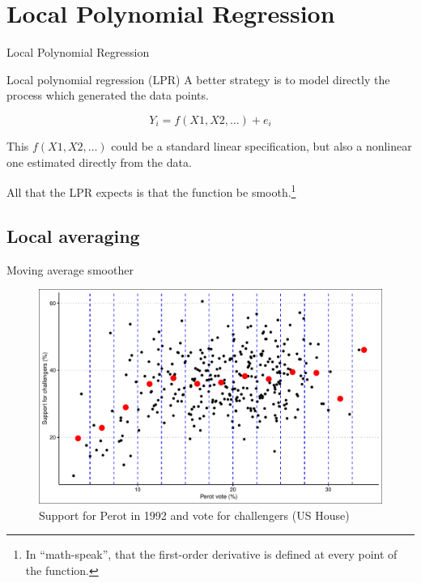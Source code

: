 \documentclass[12pt,english,pdf,xcolor=dvipsnames,aspectratio=169,handout]{beamer}\usepackage[]{graphicx}\usepackage[]{xcolor}
\begin{document}
\section{Local Polynomial Regression}

\begin{frame}
\begin{center}
    \Huge Local Polynomial Regression
\end{center}
\end{frame}


\begin{frame}{Local polynomial regression (LPR)}
A better strategy is to model directly the process which generated the data points.\bigskip

\begin{equation}
Y_i = f(X1, X2, \dots) + e_i
\end{equation}

This $f(X1, X2, \dots)$ could be a standard linear specification, but also a nonlinear one estimated directly from the data.\bigskip

All that the LPR expects is that the function be smooth.\footnote{In ``math-speak'', that the first-order derivative is defined at every point of the function.}

\end{frame}



\subsection{Local averaging}

\begin{frame}{Moving average smoother}


\begin{figure}
  \centering
  \includegraphics[scale=0.5]{../04-graphs/04-03}
  \caption{Support for Perot in 1992 and vote for challengers (US House)}
\end{figure}

\end{frame}
\end{document}

